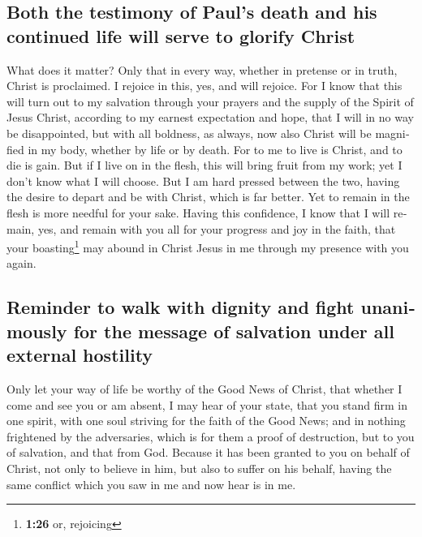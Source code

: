\begin{paracol}{2}
\begin{otherlanguage}{english}
\hypertarget{both-the-testimony-of-pauls-death-and-his-continued-life-will-serve-to-glorify-christ}{%
\subsection{Both the testimony of Paul's death and his continued life
will serve to glorify
Christ}\label{both-the-testimony-of-pauls-death-and-his-continued-life-will-serve-to-glorify-christ}}

 What does it matter? Only that in every way, whether in
pretense or in truth, Christ is proclaimed. I rejoice in this, yes, and
will rejoice.  For I know that this will turn out to my
salvation through your prayers and the supply of the Spirit of Jesus
Christ,  according to my earnest expectation and hope,
that I will in no way be disappointed, but with all boldness, as always,
now also Christ will be magnified in my body, whether by life or by
death.  For to me to live is Christ, and to die is gain.
 But if I live on in the flesh, this will bring fruit
from my work; yet I don't know what I will choose.  But I
am hard pressed between the two, having the desire to depart and be with
Christ, which is far better.  Yet to remain in the flesh
is more needful for your sake.  Having this confidence, I
know that I will remain, yes, and remain with you all for your progress
and joy in the faith,  that your boasting\footnote{\textbf{1:26}
  or, rejoicing} may abound in Christ Jesus in me through my presence
with you again.

\hypertarget{reminder-to-walk-with-dignity-and-fight-unanimously-for-the-message-of-salvation-under-all-external-hostility}{%
\subsection{Reminder to walk with dignity and fight unanimously for the
message of salvation under all external
hostility}\label{reminder-to-walk-with-dignity-and-fight-unanimously-for-the-message-of-salvation-under-all-external-hostility}}

 Only let your way of life be worthy of the Good News of
Christ, that whether I come and see you or am absent, I may hear of your
state, that you stand firm in one spirit, with one soul striving for the
faith of the Good News;  and in nothing frightened by the
adversaries, which is for them a proof of destruction, but to you of
salvation, and that from God.  Because it has been
granted to you on behalf of Christ, not only to believe in him, but also
to suffer on his behalf,  having the same conflict which
you saw in me and now hear is in me.


\end{otherlanguage}
\end{paracol}
